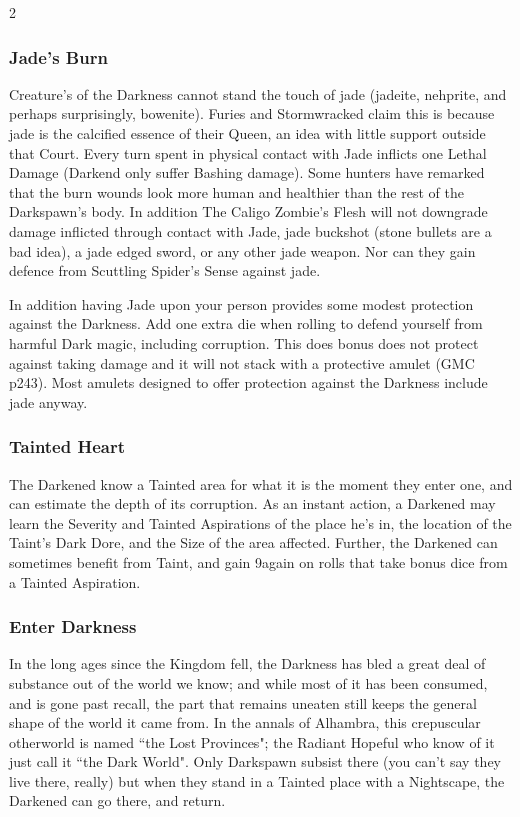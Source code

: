 \begin{multicols}{2}
\subsubsection*{Jade's Burn}
Creature's of the Darkness cannot stand the touch of jade (jadeite, nehprite, and perhaps surprisingly, bowenite). Furies and Stormwracked claim this is because jade is the calcified essence of their Queen, an idea with little support outside that Court. Every turn spent in physical contact with Jade inflicts one Lethal Damage (Darkend only suffer Bashing damage). Some hunters have remarked that the burn wounds look more human and healthier than the rest of the Darkspawn's body. In addition The Caligo Zombie's Flesh will not downgrade damage inflicted through contact with Jade, jade buckshot (stone bullets are a bad idea), a jade edged sword, or any other jade weapon. Nor can they gain defence from Scuttling Spider's Sense against jade.

In addition having Jade upon your person provides some modest protection against the Darkness. Add one extra die when rolling to defend yourself from harmful Dark magic, including corruption. This does bonus does not protect against taking damage and it will not stack with a protective amulet (GMC p243). Most amulets designed to offer protection against the Darkness include jade anyway. 
\subsubsection*{Tainted Heart}
The Darkened know a Tainted area for what it is the moment they enter one, and can estimate the depth of its corruption. As an instant action, a Darkened may learn the Severity and Tainted Aspirations of the place he's in, the location of the Taint's Dark Dore, and the Size of the area affected. Further, the Darkened can sometimes benefit from Taint, and gain 9again on rolls that take bonus dice from a Tainted Aspiration. 
\subsubsection*{Enter Darkness}
In the long ages since the Kingdom fell, the Darkness has bled a great deal of substance out of the world we know; and while most of it has been consumed, and is gone past recall, the part that remains uneaten still keeps the general shape of the world it came from. In the annals of Alhambra, this crepuscular otherworld is named \textquotedblleft the Lost Provinces"; the Radiant Hopeful who know of it just call it \textquotedblleft the Dark World". Only Darkspawn subsist there (you can't say they live there, really) but when they stand in a Tainted place with a Nightscape, the Darkened can go there, and return.


\end{multicols}
